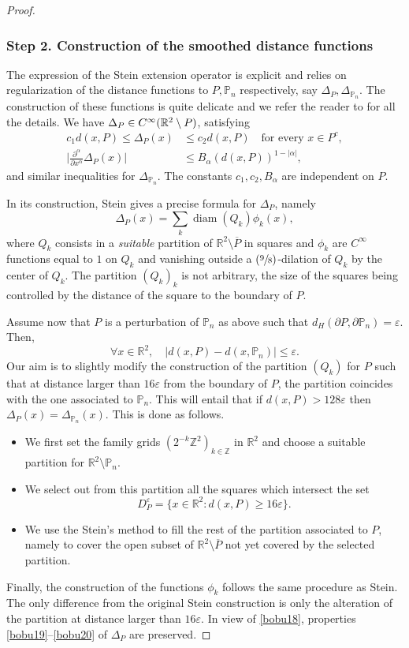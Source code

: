 \documentclass[JEP,XML,SOM,Unicode,ThmDefs,NoFloatCountersInSection,published]{cedram}
\newcommand{\Psfrac}[2]{(\sfrac{#1}{#2})}
\theoremstyle{plain}
\theoremstyle{definition}
\newcommand{\diam}{\operatorname{diam}}
\let\Bbb\mathbb
\def\R{\mathbb{R}}
\def\Z{\mathbb{Z}}
\newcommand{\vps}{\varepsilon}
\begin{document}
\begin{proof}
\subsubsection*{Step 2. Construction of the smoothed distance functions} The expression of the Stein extension operator is explicit and relies on regularization of the distance functions to $P, \Bbb P_n$ respectively, say $\Delta_P, \Delta_{\Bbb P_n}$. The construction of these functions is quite delicate and we refer the reader to \cite[Th.\,2, p.\,171]{St70} for all the details. We have $\Delta_P \in C^\infty(\R^2 \setminus\nobreak P)$, satisfying
\begin{align}\label{bobu19}
c_1 d(x, P)\le \Delta _P (x) &\le c_2 d(x, P) \quad\text{for every } x \in P^c,
\\
\label{bobu20}
\Big |\frac{\partial^\alpha}{\partial x^\alpha} \Delta_P (x)\Big |&\le B_\alpha (d(x, P))^{1-|\alpha|},
\end{align}
and similar inequalities for $\Delta_{\Bbb P_n}$. The constants $c_1,c_2, B_\alpha$ are independent on $P$.

In its construction, Stein gives a precise formula for $\Delta_P$, namely
\[
\Delta_P(x) = \sum_k \diam (Q_k) \phi_k(x),
\]
where $Q_k$ consists in a {\it suitable} partition of $\R^2\setminus \overline P$ in squares and $\phi_k$ are $C^\infty$ functions equal to $1$ on $Q_k$ and vanishing outside a $\Psfrac 98$-dilation of $Q_k$ by the center of $Q_k$. The partition $(Q_k)_k$ is not arbitrary, the size of the squares being controlled by the distance of the square to the boundary of $P$.

Assume now that $P$ is a perturbation of $\Bbb P_n$ as above such that $d_H(\partial P, \partial \Bbb P_n) =\vps$. Then,
\begin{equation}\label{bobu18}
\forall x \in \R^2, \quad |d(x, P)-d(x, \Bbb P_n)| \le \vps.
\end{equation}
Our aim is to slightly modify the construction of the partition $(Q_k)$ for $P$ such that at distance larger than $16 \vps$ from the boundary of $P$, the partition coincides with the one associated to $\Bbb P_n$. This will entail that if $d(x, P) > 128 \vps$ then $\Delta_P(x) =\Delta_{\Bbb P_n}(x)$. This is done as follows.
\begin{itemize}
\item We first set the family grids $(2^{-k} \Z^2)_{k \in \Z}$ in $\R^2$ and choose a suitable partition for $\R^2\setminus \Bbb P_n$.
\item We select out from this partition all the squares which intersect the set
\[
D^\vps_P=\{x\in \R^2 : d(x, P) \ge 16 \vps\}.
\]
\item We use the Stein's method to fill the rest of the partition associated to $P$, namely to cover the open subset of $\R^2 \setminus \overline P$ not yet covered by the selected partition.
\end{itemize}
Finally, the construction of the functions $\phi_k$ follows the same procedure as Stein. The only difference from the original Stein construction is only the alteration of the partition at distance larger than $16\vps$. In view of \eqref{bobu18}, properties \eqref{bobu19}--\eqref{bobu20} of $\Delta_P$ are preserved.


\end{proof}
\end{document}

